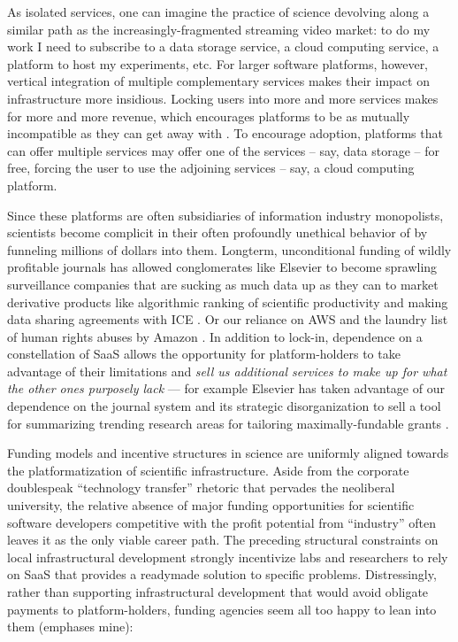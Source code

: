 \documentclass[10pt]{article}
\begin{document}
\begin{multicols}{2}
As isolated services, one can imagine the practice of science devolving
along a similar path as the increasingly-fragmented streaming video
market: to do my work I need to subscribe to a data storage service, a
cloud computing service, a platform to host my experiments, etc. For
larger software platforms, however, vertical integration of multiple
complementary services makes their impact on infrastructure more
insidious. Locking users into more and more services makes for more and
more revenue, which encourages platforms to be as mutually incompatible
as they can get away with \cite{macinnesCompatibilityStandardsMonopoly2005} . To encourage adoption,
platforms that can offer multiple services may offer one of the services
-- say, data storage -- for free, forcing the user to use the adjoining
services -- say, a cloud computing platform.

Since these platforms are often subsidiaries of information industry
monopolists, scientists become complicit in their often profoundly
unethical behavior of by funneling millions of dollars into them.
Longterm, unconditional funding of wildly profitable journals has
allowed conglomerates like Elsevier to become sprawling surveillance
companies \cite{RELXAnnualReport2020, pooleySurveillancePublishing2021}  that are sucking as much data up
as they can to market derivative products like algorithmic ranking of
scientific productivity \cite{brembsAlgorithmicEmploymentDecisions2021}  and making data sharing
agreements with ICE \cite{biddleLexisNexisProvideGiant2021} . Or
our reliance on AWS and the laundry list of human rights abuses by
Amazon \cite{CriticismAmazon2021} . In addition to lock-in,
dependence on a constellation of SaaS allows the opportunity for
platform-holders to take advantage of their limitations and \emph{sell
us additional services to make up for what the other ones purposely
lack} --- for example Elsevier has taken advantage of our dependence on
the journal system and its strategic disorganization to sell a tool for
summarizing trending research areas for tailoring maximally-fundable
grants \cite{elsevierTopicProminenceSciencea} .

Funding models and incentive structures in science are uniformly aligned
towards the platformatization of scientific infrastructure. Aside from
the corporate doublespeak ``technology transfer'' rhetoric that pervades
the neoliberal university, the relative absence of major funding
opportunities for scientific software developers competitive with the
profit potential from ``industry'' often leaves it as the only viable
career path. The preceding structural constraints on local
infrastructural development strongly incentivize labs and researchers to
rely on SaaS that provides a readymade solution to specific problems.
Distressingly, rather than supporting infrastructural development that
would avoid obligate payments to platform-holders, funding agencies seem
all too happy to lean into them (emphases mine):


\end{multicols}
\end{document}

